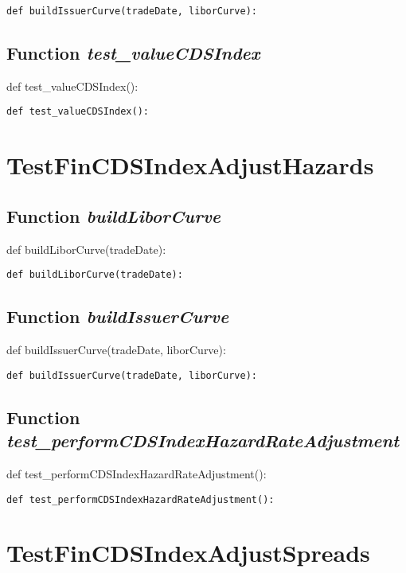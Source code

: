 \documentclass[twoside,11pt]{book}
\begin{document}
\begin{lstlisting}
def buildIssuerCurve(tradeDate, liborCurve):
\end{lstlisting}

\subsection{Function {\it test\_valueCDSIndex}}
def test\_valueCDSIndex():

\begin{lstlisting}
def test_valueCDSIndex():
\end{lstlisting}


\newpage
\section{TestFinCDSIndexAdjustHazards}

\subsection{Function {\it buildLiborCurve}}
def buildLiborCurve(tradeDate):

\begin{lstlisting}
def buildLiborCurve(tradeDate):
\end{lstlisting}

\subsection{Function {\it buildIssuerCurve}}
def buildIssuerCurve(tradeDate, liborCurve):

\begin{lstlisting}
def buildIssuerCurve(tradeDate, liborCurve):
\end{lstlisting}

\subsection{Function {\it test\_performCDSIndexHazardRateAdjustment}}
def test\_performCDSIndexHazardRateAdjustment():

\begin{lstlisting}
def test_performCDSIndexHazardRateAdjustment():
\end{lstlisting}


\newpage
\section{TestFinCDSIndexAdjustSpreads}
\end{document}

